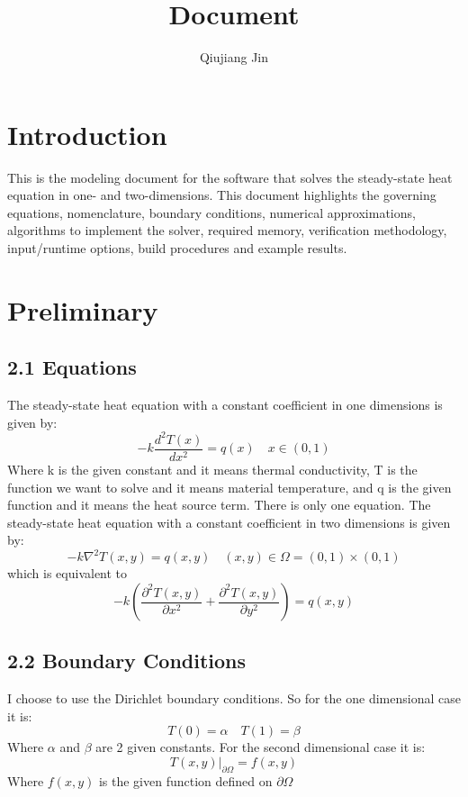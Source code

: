 \documentclass{article}
\title{Document}
\author{Qiujiang Jin}
\date{ }
\begin{document}
 
\maketitle
 
\tableofcontents
 
\section{Introduction}
 
This is the modeling document for the software that solves the steady-state heat equation in one- and two-dimensions. This document highlights the governing equations, nomenclature, boundary conditions, numerical approximations, algorithms to implement the solver, required memory, verification methodology, input/runtime options, build procedures and example results.

\section{Preliminary}

\subsection*{2.1 Equations}
The steady-state heat equation with a constant coefficient in one dimensions is given by:
\[
-k\frac{d^2 T(x)}{dx^2} = q(x)\quad
x \in (0, 1)
\]
Where k is the given constant and it means thermal conductivity, T is the function we want to solve and it means material temperature, and q is the given function and it means the heat source term. There is only one equation. The steady-state heat equation with a constant coefficient in two dimensions is given by:
\[
-k{\nabla}^2{T(x, y)} = q(x, y)\quad
(x, y) \in \Omega = (0, 1)\times(0, 1)
\]
which is equivalent to
\[
-k(\frac{\partial^2 T(x, y)}{\partial x^2} + \frac{\partial^2 T(x, y)}{\partial y^2})= q(x, y)
\]

\subsection*{2.2 Boundary Conditions}
I choose to use the Dirichlet boundary conditions. So for the one dimensional case it is:
\[
T(0) = \alpha \quad T(1) = \beta
\]
Where $\alpha$ and $\beta$ are 2 given constants. For the second dimensional case it is:
\[
T(x, y)|_{\partial\Omega} = f(x, y)
\]
Where $f(x, y)$ is the given function defined on $\partial\Omega$
\end{document}
